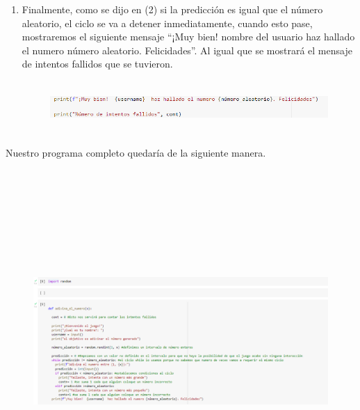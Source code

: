 \documentclass[a4paper,12pt]{article}
\begin{document}
\begin{enumerate}
    \item \large{Finalmente, como se dijo en (2) si la predicción es igual que el número aleatorio, el ciclo se va a detener inmediatamente, cuando esto pase, mostraremos el siguiente mensaje {``¡Muy bien! {nombre del usuario} haz hallado el numero {número aleatorio}. Felicidades''}. Al igual que se mostrará el mensaje de intentos fallidos que se tuvieron.}

    \begin{figure}[H]
    \caption{}
    \centering \includegraphics[width=14cm, height=2cm]{a_14.png}
    \label{fig1:my_label}
    \end{figure}  
    
\end{enumerate}  

\large{Nuestro programa completo quedaría de la siguiente manera.}

    \begin{figure}[H]
    \caption{}
    \centering \includegraphics[width=19cm, height=13cm]{a_15.png}
    \label{fig1:my_label}
    \end{figure}  
\end{document}
